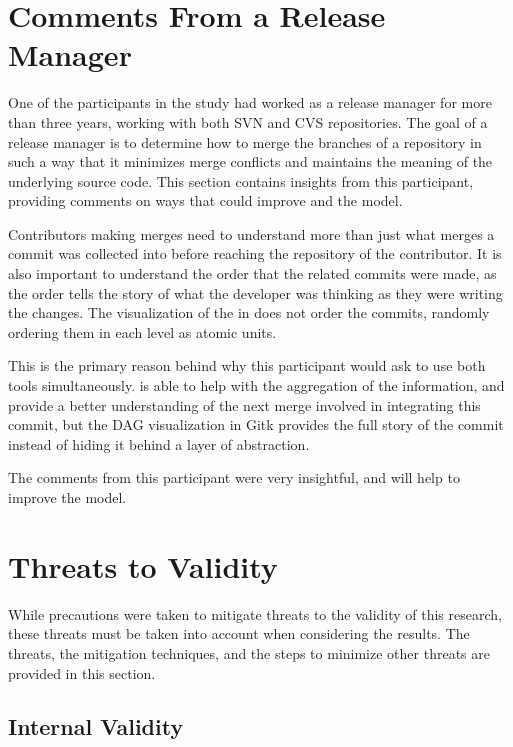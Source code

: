 \section{Comments From a Release Manager}\label{sec:comments_from_a_release_manager}

One of the participants in the study had worked as a release manager for
more than three years, working with both SVN and CVS repositories. The
goal of a release manager is to determine how to merge the branches of a
repository in such a way that it minimizes merge conflicts and maintains
the meaning of the underlying source code. This section contains
insights from this participant, providing comments on ways that could
improve \tool{} and the \mt{} model.

Contributors making merges need to understand more than just what merges
a commit was collected into before reaching the repository of the
contributor.
It is also important to understand the order that the
related commits were made, as the order tells the story of what the
developer was thinking as they were writing the changes.
The visualization of the \mt{} in \tool{} does not order the commits,
randomly ordering them in each level as atomic units.


This is the primary reason behind why this participant would ask to use
both tools simultaneously. \tool{} is able to help with the aggregation
of the information, and provide a better understanding of the next merge
involved in integrating this commit, but the DAG visualization in Gitk
provides the full story of the commit instead of hiding it behind a
layer of abstraction.

The comments from this participant were very insightful, and will help
to improve the \mt{} model.

\section{Threats to Validity}\label{sec:threats_to_validity}

While precautions were taken to mitigate threats to the validity of this
research, these threats must be taken into account when considering the results.
The threats, the mitigation techniques, and the steps to minimize
other threats are provided in this section.

\subsection{Internal Validity}\label{sub:internal_validity}

